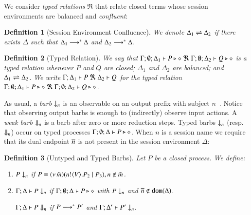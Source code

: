 \documentclass[preprint,11pt]{elsarticle}
\newtheorem{definition}{Definition}[section]
\begin{document}
We consider \emph{typed relations} $\Re$ that relate  closed terms whose
session environments %
are balanced  and \emph{confluent}:

\begin{definition}[Session Environment Confluence]
	We denote $\Delta_1 \rightleftharpoons \Delta_2$ if there exists $\Delta$ such that
	$\Delta_1 \longrightarrow^\ast \Delta$ and $\Delta_2 \longrightarrow^\ast \Delta$.
\end{definition}



\begin{definition}[Typed Relation]
	We say that
	$\Gamma; \emptyset; \Delta_1 \vdash P \triangleright \diamond\ \Re \ \Gamma; \emptyset; \Delta_2 \vdash Q \triangleright \diamond$
	is a {\em typed relation} whenever
	$P$ and $Q$ are closed;
	$\Delta_1$ and $\Delta_2$ are balanced; and 
	$\Delta_1 \rightleftharpoons \Delta_2$.
	We write $\horel{\Gamma}{\Delta_1}{P}{\ \Re \ }{\Delta_2}{Q}$
	for the typed relation $\Gamma; \emptyset; \Delta_1 \vdash P \triangleright \diamond\ \Re \ \Gamma; \emptyset; \Delta_2 \vdash Q \triangleright \diamond$.
\end{definition}


As usual, a \emph{barb} $\downarrow_{n}$ is an observable on an output prefix with subject $n$~\cite{MiSa92}.
Notice that observing output barbs is enough to (indirectly) observe input actions.
A \emph{weak barb} $\Downarrow_{n}$ is a barb after zero or more reduction steps.
Typed barbs $\downarrow_{n}$ (resp.\ $\Downarrow_{n}$)
occur on typed processes $\Gamma; \emptyset; \Delta \vdash P \triangleright \diamond$.
When $n$ is a session name we require that its dual endpoint $\overline{n}$ is not present
in the session environment $\Delta$:

\begin{definition}[Untyped and Typed Barbs]\label{d:barb}%
	Let $P$ be a closed process. We define:
	\begin{enumerate}[1.]
		\item	
		$P \downarrow_{n}$ if $P \equiv (\nu\, \tilde{m})(n ! \langle V \rangle . P_2 \;|\; P_3), n \notin \tilde{m}$. %

		\item	$\Gamma; \Delta \vdash P \downarrow_{n}$ if
			$\Gamma; \emptyset; \Delta \vdash P \triangleright \diamond$ with $P \downarrow_{n}$ and $\overline{n} \notin \mathtt{dom}(\Delta)$.

			$\Gamma; \Delta \vdash P \Downarrow_{n}$ if $P \longrightarrow^* P'$ and
			$\Gamma; \Delta' \vdash P' \downarrow_{n}$.			
	\end{enumerate}
\end{definition}
\end{document}
